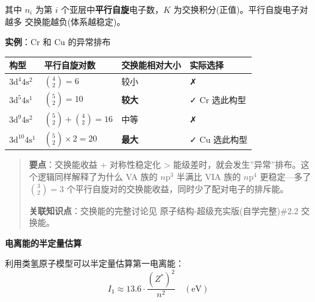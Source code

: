 其中 \(n_i\) 为第 \(i\) 个亚层中\textbf{平行自旋}电子数，\(K\) 为交换积分(正值)。平行自旋电子对越多 \箭 交换能越负(体系越稳定)。

\textbf{实例}：Cr 和 Cu 的异常排布

{\def\LTcaptype{none} %
\begin{longtable}[]{@{}
  >{\centering\arraybackslash}p{}
  >{\centering\arraybackslash}p{}
  >{\centering\arraybackslash}p{}
  >{\centering\arraybackslash}p{}@{}}
\toprule\noalign{}
\begin{minipage}[b]{\linewidth}\centering
构型
\end{minipage} & \begin{minipage}[b]{\linewidth}\centering
平行自旋对数
\end{minipage} & \begin{minipage}[b]{\linewidth}\centering
交换能相对大小
\end{minipage} & \begin{minipage}[b]{\linewidth}\centering
实际选择
\end{minipage} \\
\midrule\noalign{}
\endhead
\bottomrule\noalign{}
\endlastfoot
\(3\mathrm{d}^4 4\mathrm{s}^2\) & \(\binom{4}{2}=6\) & 较小 & ✗ \\
\(3\mathrm{d}^5 4\mathrm{s}^1\) & \(\binom{5}{2}=10\) & \textbf{较大} & ✓ Cr 选此构型 \\
\(3\mathrm{d}^9 4\mathrm{s}^2\) & \(\binom{5}{2}+\binom{4}{2}=16\) & 中等 & ✗ \\
\(3\mathrm{d}^{10} 4\mathrm{s}^1\) & \(\binom{5}{2}\times2=20\) & \textbf{最大} & ✓ Cu 选此构型 \\
\end{longtable}
}

\begin{quote}
\textbf{要点}：交换能收益 + 对称性稳定化 \textgreater{} 能级差时，就会发生''异常''排布。这个逻辑同样解释了为什么 VA 族的 \(n\mathrm{p}^3\) 半满比 VIA 族的 \(n\mathrm{p}^4\) 更稳定---多了 \(\binom{3}{2}=3\) 个平行自旋对的交换能收益，同时少了配对电子的排斥能。

\textbf{关联知识点}：交换能的完整讨论见 原子结构-超级充实版(自学完整)\#2.2 交换能。
\end{quote}

\textbf{电离能的半定量估算}

利用类氢原子模型可以半定量估算第一电离能：
\[I_1 \approx 13.6 \cdot \frac{(Z^*)^2}{n^2} \quad (\text{eV})\]

